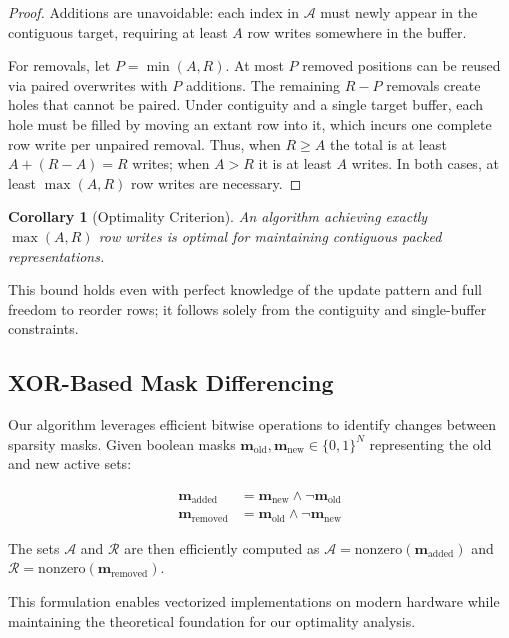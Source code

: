 \documentclass{article}
\numberwithin{equation}{section}
\theoremstyle{plain}
\newtheorem{corollary}[theorem]{Corollary}
\theoremstyle{definition}
\theoremstyle{remark}
\begin{document}
\begin{proof}
Additions are unavoidable: each index in $\mathcal{A}$ must newly appear in the contiguous target, requiring at least $A$ row writes somewhere in the buffer.

For removals, let $P=\min(A,R)$. At most $P$ removed positions can be reused via paired overwrites with $P$ additions. The remaining $R-P$ removals create holes that cannot be paired. Under contiguity and a single target buffer, each hole must be filled by moving an extant row into it, which incurs one complete row write per unpaired removal. Thus, when $R\ge A$ the total is at least $A+(R-A)=R$ writes; when $A>R$ it is at least $A$ writes. In both cases, at least $\max(A,R)$ row writes are necessary.
\end{proof}

\begin{corollary}[Optimality Criterion]
An algorithm achieving exactly $\max(A, R)$ row writes is optimal for maintaining contiguous packed representations.
\end{corollary}

This bound holds even with perfect knowledge of the update pattern and full freedom to reorder rows; it follows solely from the contiguity and single-buffer constraints.

\subsection{XOR-Based Mask Differencing}

Our algorithm leverages efficient bitwise operations to identify changes between sparsity masks. Given boolean masks $\mathbf{m}_{\text{old}}, \mathbf{m}_{\text{new}} \in \{0, 1\}^N$ representing the old and new active sets:

\begin{align}
\mathbf{m}_{\text{added}} &= \mathbf{m}_{\text{new}} \land \neg \mathbf{m}_{\text{old}} \\
\mathbf{m}_{\text{removed}} &= \mathbf{m}_{\text{old}} \land \neg \mathbf{m}_{\text{new}}
\end{align}

The sets $\mathcal{A}$ and $\mathcal{R}$ are then efficiently computed as $\mathcal{A} = \text{nonzero}(\mathbf{m}_{\text{added}})$ and $\mathcal{R} = \text{nonzero}(\mathbf{m}_{\text{removed}})$.

This formulation enables vectorized implementations on modern hardware while maintaining the theoretical foundation for our optimality analysis.
\end{document}
